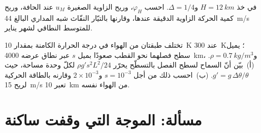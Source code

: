 \begin{exercise}[$\star\star\star$]\label{exo:b3:atmospheric-dynamics:11}
في  خذ $H = \qty{12}{km}$ و$\Delta = 1/4$. احسب
$\varphi_H$، وريح الزاوية الصغيرة $u_M$ عند الحافة، وريح كمية الحركة الزاوية
الدقيقة عندها، وقارنها بالتيّار النفّاث شبه المداري البالغ
\qty{44}{m/s} للمتوسط النطاقي لشهر يناير.
\end{exercise}

\begin{exercise}[$\star\star\star$]\label{exo:b3:atmospheric-dynamics:12}
تختلف طبقتان من الهواء في درجة الحرارة الكامنة بمقدار \qty{10}{K}
عند \qty{300}{K}؛ يميل سطح فصلهما نحو القطب صعودًا بميل $s$
عبر نطاق عرضه \qty{4000}{km}، و$\rho = \qty{0.7}{kg/m^3}$. (أ)~بيّن أنّ السماح
لسطح الفصل بالتسطّح يحرّر $\rho g' s^2L^2/24$ لكلّ وحدة مساحة،
حيث $g' = g\,\Delta\theta/\theta$. (ب)~احسب ذلك من أجل $s = 10^{-3}$ و$2\times10^{-3}$
وقارنه بالطاقة الحركية لريح \qty{15}{m/s}
تعبر \qty{10}{km} من الهواء نفسه.
\end{exercise}

\section{مسألة: الموجة التي وقفت ساكنة}

